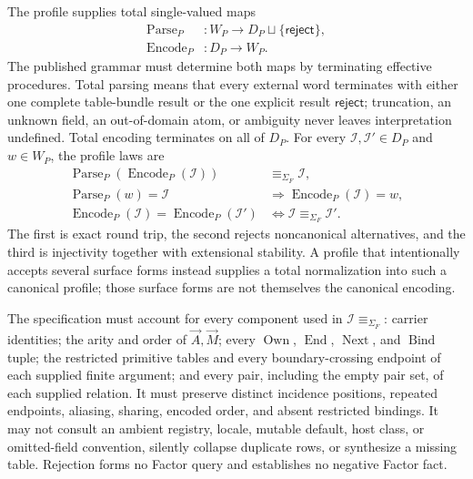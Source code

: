 \documentclass[11pt,twoside]{article}
\begin{document}
The profile supplies total single-valued maps
\[
\begin{aligned}
 \operatorname{Parse}_P &: W_P\longrightarrow
                 D_P\mathbin{\sqcup}\{\mathsf{reject}\},\\
 \operatorname{Encode}_P &: D_P\longrightarrow W_P .
\end{aligned}
\]
The published grammar must determine both maps by terminating effective
procedures.  Total parsing means that every external word terminates with either
one complete table-bundle result or the one explicit result
\(\mathsf{reject}\); truncation, an unknown field, an out-of-domain atom, or
ambiguity never leaves interpretation undefined.  Total encoding terminates on
all of \(D_P\).  For every
\(\mathcal I,\mathcal I'\in D_P\) and \(w\in W_P\), the profile laws are
\[
\begin{aligned}
 \operatorname{Parse}_P(\operatorname{Encode}_P(\mathcal I))
     &\equiv_{\Sigma_F}\mathcal I,\\
 \operatorname{Parse}_P(w)=\mathcal I
     &\Longrightarrow \operatorname{Encode}_P(\mathcal I)=w,\\
 \operatorname{Encode}_P(\mathcal I)
     =\operatorname{Encode}_P(\mathcal I')
     &\Longleftrightarrow
       \mathcal I\equiv_{\Sigma_F}\mathcal I'.
\end{aligned}
\]
The first is exact round trip, the second rejects noncanonical alternatives, and
the third is injectivity together with extensional stability.  A profile that
intentionally accepts several surface forms instead supplies a total
normalization into such a canonical profile; those surface forms are not
themselves the canonical encoding.

The specification must account for every component used in
\(\mathcal I\equiv_{\Sigma_F}\): carrier identities; the arity and order of
\(\vec A,\vec M\); every
\(\operatorname{Own}\), \(\operatorname{End}\), \(\operatorname{Next}\), and
\(\operatorname{Bind}\) tuple; the restricted primitive tables and every
boundary-crossing endpoint of each supplied finite argument; and every pair,
including the empty pair set, of each supplied relation.  It must preserve
distinct incidence positions, repeated endpoints, aliasing, sharing, encoded
order, and absent restricted bindings.  It may not consult an ambient registry,
locale, mutable default, host class, or omitted-field convention, silently
collapse duplicate rows, or synthesize a missing table.  Rejection forms no
Factor query and establishes no negative Factor fact.
\end{document}
